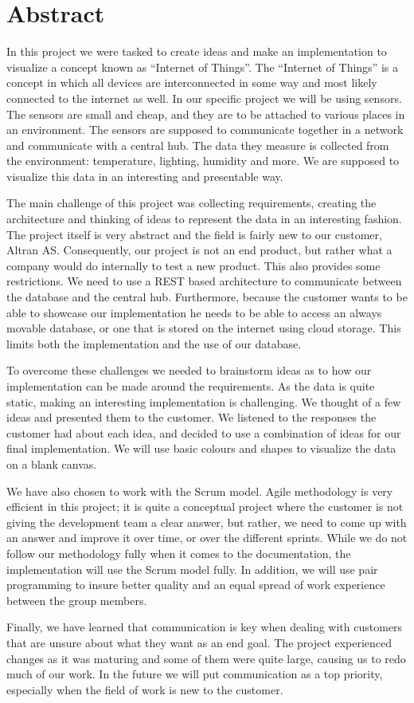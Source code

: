 ﻿\documentclass[../document.tex]{subfiles}
\begin{document}
\section*{Abstract}
In this project we were tasked to create ideas and make an implementation to visualize a concept known as “Internet of Things”. The “Internet of Things” is a concept in which all devices are interconnected in some way and most likely connected to the internet as well. In our specific project we will be using sensors. The sensors are small and cheap, and they are to be attached to various places in an environment. The sensors are supposed to communicate together in a network and communicate with a central hub. The data they measure is collected from the environment: temperature, lighting, humidity and more. We are supposed to visualize this data in an interesting and presentable way.

The main challenge of this project was collecting requirements, creating the architecture and thinking of ideas to represent the data in an interesting fashion. The project itself is very abstract and the field is fairly new to our customer, Altran AS. Consequently, our project is not an end product, but rather what a company would do internally to test a new product. This also provides some restrictions. We need to use a REST based architecture to communicate between the database and the central hub. Furthermore, because the customer wants to be able to showcase our implementation he needs to be able to access an always movable database, or one that is stored on the internet using cloud storage. This limits both the implementation and the use of our database.

To overcome these challenges we needed to brainstorm ideas as to how our implementation can be made around the requirements. As the data is quite static, making an interesting implementation is challenging. We thought of a few ideas and presented them to the customer. We listened to the responses the customer had about each idea, and decided to use a combination of ideas for our final implementation. We will use basic colours and shapes to visualize the data on a blank canvas.

We have also chosen to work with the Scrum model. Agile methodology is very efficient in this project; it is quite a conceptual project where the customer is not giving the development team a clear answer, but rather, we need to come up with an answer and improve it over time, or over the different sprints. While we do not follow our methodology fully when it comes to the documentation, the implementation will use the Scrum model fully. In addition, we will use pair programming to insure better quality and an equal spread of work experience between the group members.

Finally, we have learned that communication is key when dealing with customers that are unsure about what they want as an end goal. The project experienced changes as it was maturing and some of them were quite large, causing us to redo much of our work. In the future we will put communication as a top priority, especially when the field of work is new to the customer.
\end{document}
